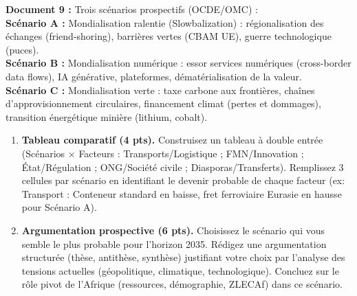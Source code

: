 \documentclass[11pt]{article}
\begin{document}
\begin{exercice}
\textbf{Document 9 :} Trois scénarios prospectifs (OCDE/OMC) :\\
\textbf{Scénario A :} \og Mondialisation ralentie (Slowbalization) \fg : régionalisation des échanges (friend-shoring), barrières vertes (CBAM UE), guerre technologique (puces).\\
\textbf{Scénario B :} \og Mondialisation numérique \fg : essor services numériques (cross-border data flows), IA générative, plateformes, dématérialisation de la valeur.\\
\textbf{Scénario C :} \og Mondialisation verte \fg : taxe carbone aux frontières, chaînes d'approvisionnement circulaires, financement climat (pertes et dommages), transition énergétique minière (lithium, cobalt).

\begin{enumerate}
    \item \textbf{Tableau comparatif (4 pts).} Construisez un tableau à double entrée (Scénarios $\times$ Facteurs : Transports/Logistique ; FMN/Innovation ; État/Régulation ; ONG/Société civile ; Diasporas/Transferts). Remplissez 3 cellules par scénario en identifiant le devenir probable de chaque facteur (ex: Transport : \og Conteneur standard en baisse, fret ferroviaire Eurasie en hausse \fg pour Scénario A).
    \item \textbf{Argumentation prospective (6 pts).} Choisissez le scénario qui vous semble le plus probable pour l'horizon 2035. Rédigez une argumentation structurée (thèse, antithèse, synthèse) justifiant votre choix par l'analyse des tensions actuelles (géopolitique, climatique, technologique). Concluez sur le rôle pivot de l'Afrique (ressources, démographie, ZLECAf) dans ce scénario.
\end{enumerate}
\end{exercice}
\end{document}

